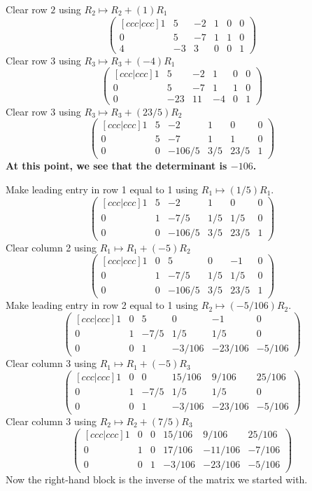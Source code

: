 \documentclass{article}
\begin{document}
Clear row \(2\) using \(R_2\mapsto R_2+(1)R_1\)\[\begin{pmatrix}[ c c
c | c c c ] 1 & 5 & -2 & 1 & 0 & 0 \\ 0 & 5 & -7 & 1 & 1 & 0 \\ 4 & -3
& 3 & 0 & 0 & 1 \end{pmatrix}\]Clear row \(3\) using \(R_3\mapsto
R_3+(-4)R_1\)\[\begin{pmatrix}[ c c c | c c c ] 1 & 5 & -2 & 1 & 0 & 0
\\ 0 & 5 & -7 & 1 & 1 & 0 \\ 0 & -23 & 11 & -4 & 0 & 1
\end{pmatrix}\]Clear row \(3\) using \(R_3\mapsto
R_3+(23/5)R_2\)\[\begin{pmatrix}[ c c c | c c c ] 1 & 5 & -2 & 1 & 0 &
0 \\ 0 & 5 & -7 & 1 & 1 & 0 \\ 0 & 0 & -106/5 & 3/5 & 23/5 & 1
\end{pmatrix}\]
{\bf At this point, we see that the determinant is \(-106\).}


Make leading entry in row 1 equal to 1 using
\(R_1\mapsto (1/5)R_1\). \[\begin{pmatrix}[ c c c | c c c ] 1 & 5 &
-2 & 1 & 0 & 0 \\ 0 & 1 & -7/5 & 1/5 & 1/5 & 0 \\ 0 & 0 & -106/5 & 3/5
& 23/5 & 1 \end{pmatrix}\]Clear column 2 using \(R_1\mapsto
R_1+(-5)R_2\)\[\begin{pmatrix}[ c c c | c c c ] 1 & 0 & 5 & 0 & -1 & 0
\\ 0 & 1 & -7/5 & 1/5 & 1/5 & 0 \\ 0 & 0 & -106/5 & 3/5 & 23/5 & 1
\end{pmatrix}\]Make leading entry in row 2 equal to 1 using
\(R_2\mapsto (-5/106)R_2\). \[\begin{pmatrix}[ c c c | c c c ] 1 & 0
& 5 & 0 & -1 & 0 \\ 0 & 1 & -7/5 & 1/5 & 1/5 & 0 \\ 0 & 0 & 1 & -3/106
& -23/106 & -5/106 \end{pmatrix}\]Clear column 3 using \(R_1\mapsto
R_1+(-5)R_3\)\[\begin{pmatrix}[ c c c | c c c ] 1 & 0 & 0 & 15/106 &
9/106 & 25/106 \\ 0 & 1 & -7/5 & 1/5 & 1/5 & 0 \\ 0 & 0 & 1 & -3/106 &
-23/106 & -5/106 \end{pmatrix}\]Clear column 3 using \(R_2\mapsto
R_2+(7/5)R_3\)\[\begin{pmatrix}[ c c c | c c c ] 1 & 0 & 0 & 15/106 &
9/106 & 25/106 \\ 0 & 1 & 0 & 17/106 & -11/106 & -7/106 \\ 0 & 0 & 1 &
-3/106 & -23/106 & -5/106 \end{pmatrix}\]Now the right-hand block is
the inverse of the matrix we started with.
\end{document}
